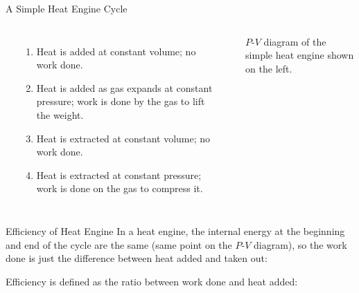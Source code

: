 \documentclass[12pt,aspectratio=169,dvipsnames]{beamer}
\begin{document}
\begin{frame}{A Simple Heat Engine Cycle}
  \begin{columns}
    \begin{center}
    \end{center}
    \begin{enumerate}
    \item\vspace{-.15in} Heat is added at constant volume; no work done.
    \item Heat is added as gas expands at constant pressure; work is done by
      the gas to lift the weight.
    \item Heat is extracted at constant volume; no work done.
    \item Heat is extracted at constant pressure; work is done on the gas to
      compress it.
    \end{enumerate}

    \\
    {\footnotesize $P$-$V$ diagram of the simple heat engine shown on the left.
      \par}
  \end{columns}
\end{frame}



\begin{frame}{Efficiency of Heat Engine}
  In a heat engine, the internal energy at the beginning and end of the cycle
  are the same (same point on the $P$-$V$ diagram), so the work done is just
  the difference between heat added and taken out:
  
  
  Efficiency is defined as the ratio between work done and heat added:

\end{frame}
\end{document}
